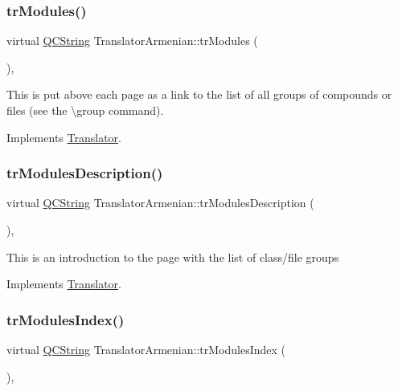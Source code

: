 \subsubsection{\texorpdfstring{trModules()}{trModules()}}
{\footnotesize\ttfamily virtual \mbox{\hyperlink{class_q_c_string}{Q\+C\+String}} Translator\+Armenian\+::tr\+Modules (\begin{DoxyParamCaption}{ }\end{DoxyParamCaption})\hspace{0.3cm}{\ttfamily [inline]}, {\ttfamily [virtual]}}

This is put above each page as a link to the list of all groups of compounds or files (see the \textbackslash{}group command). 

Implements \mbox{\hyperlink{class_translator}{Translator}}.

\mbox{\label{class_translator_armenian_a7b0be8de99293d1533e8b71a1add2ecd}} 
\subsubsection{\texorpdfstring{trModulesDescription()}{trModulesDescription()}}
{\footnotesize\ttfamily virtual \mbox{\hyperlink{class_q_c_string}{Q\+C\+String}} Translator\+Armenian\+::tr\+Modules\+Description (\begin{DoxyParamCaption}{ }\end{DoxyParamCaption})\hspace{0.3cm}{\ttfamily [inline]}, {\ttfamily [virtual]}}

This is an introduction to the page with the list of class/file groups 

Implements \mbox{\hyperlink{class_translator}{Translator}}.

\mbox{\label{class_translator_armenian_a6d7d5aa479f92b920d091f6efb5f12de}} 
\subsubsection{\texorpdfstring{trModulesIndex()}{trModulesIndex()}}
{\footnotesize\ttfamily virtual \mbox{\hyperlink{class_q_c_string}{Q\+C\+String}} Translator\+Armenian\+::tr\+Modules\+Index (\begin{DoxyParamCaption}{ }\end{DoxyParamCaption})\hspace{0.3cm}{\ttfamily [inline]}, {\ttfamily [virtual]}}

